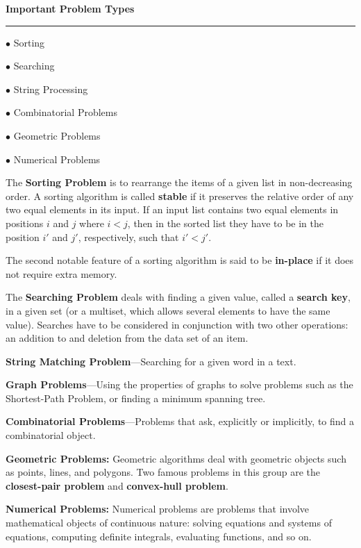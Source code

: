 \filbreak
\vskip 1cm
{\bf Important Problem Types}
\vskip 1mm
\hrule

\vskip 3mm
$\bullet$ Sorting

\vskip 3mm
$\bullet$ Searching

\vskip 3mm
$\bullet$ String Processing

\vskip 3mm
$\bullet$ Combinatorial Problems

\vskip 3mm
$\bullet$ Geometric Problems

\vskip  3mm
$\bullet$ Numerical Problems

\vskip 1cm
The {\bf Sorting Problem} is to rearrange the items of a given list in non-decreasing order. A sorting algorithm is called {\bf stable} if it preserves the relative order of any two equal elements in its input. If an input list contains two equal elements in positions $i$ and $j$ where $i<j$, then in the sorted list they have to be in the position $i'$ and $j'$, respectively, such that $i'<j'$.

\vskip 1mm
The second notable feature of a sorting algorithm is said to be {\bf in-place} if it does not require extra memory.

\filbreak
\vskip 1cm
The {\bf Searching Problem} deals with finding a given value, called a {\bf search key}, in a given set (or a multiset, which allows several elements to have the same value).
\vskip 1mm
Searches have to be considered in conjunction with two other operations: an addition to and deletion from the data set of an item.

\filbreak
\vskip 1cm
{\bf String Matching Problem}---Searching for a given word in a text.

\filbreak
\vskip 1cm
{\bf Graph Problems}---Using the properties of graphs to solve problems such as the Shortest-Path Problem, or finding a minimum spanning tree.

\filbreak
\vskip 1cm
{\bf Combinatorial Problems}---Problems that ask, explicitly or implicitly, to find a combinatorial object.

\filbreak
\vskip 1cm
{\bf Geometric Problems:} Geometric algorithms deal with geometric objects such as points, lines, and polygons. Two famous problems in this group are the {\bf closest-pair problem} and {\bf convex-hull problem}.

\filbreak
\vskip 1cm
{\bf Numerical Problems:} Numerical problems are problems that involve mathematical objects of continuous nature: solving equations and systems of equations, computing definite integrals, evaluating functions, and so on.

